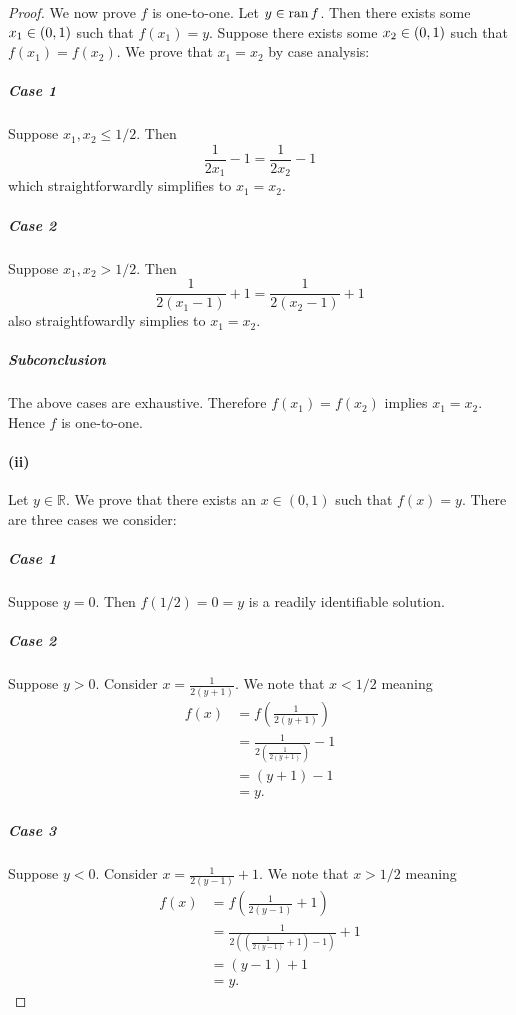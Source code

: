 \documentclass{report}
\begin{document}
\begin{proof}
      We now prove $f$ is one-to-one.
      Let $y \in \mathop{\text{ran}}{f}$.
      Then there exists some $x_1 \in \left(0, 1\right)$ such that $f(x_1) = y$.
      Suppose there exists some $x_2 \in \left(0, 1\right)$ such that $f(x_1) = f(x_2)$.
      We prove that $x_1 = x_2$ by case analysis:

      \subparagraph{Case 1}%

        Suppose $x_1, x_2 \leq 1 / 2$.
        Then $$\frac{1}{2x_1} - 1 = \frac{1}{2x_2} - 1$$ which straightforwardly
          simplifies to $x_1 = x_2$.

      \subparagraph{Case 2}%

        Suppose $x_1, x_2 > 1 / 2$.
        Then $$\frac{1}{2(x_1 - 1)} + 1 = \frac{1}{2(x_2 - 1)} + 1$$ also
          straightfowardly simplies to $x_1 = x_2$.

      \subparagraph{Subconclusion}%

        The above cases are exhaustive.
        Therefore $f(x_1) = f(x_2)$ implies $x_1 = x_2$.
        Hence $f$ is one-to-one.

    \paragraph{(ii)}%

      Let $y \in \mathbb{R}$.
      We prove that there exists an $x \in (0, 1)$ such that $f(x) = y$.
      There are three cases we consider:

      \subparagraph{Case 1}%

        Suppose $y = 0$.
        Then $f(1 / 2) = 0 = y$ is a readily identifiable solution.

      \subparagraph{Case 2}%

        Suppose $y > 0$.
        Consider $x = \frac{1}{2(y + 1)}$.
        We note that $x < 1 / 2$ meaning
          \begin{align*}
            f(x)
              & = f\left(\frac{1}{2(y + 1)}\right) \\
              & = \frac{1}{2(\frac{1}{2(y + 1)})} - 1 \\
              & = (y + 1) - 1 \\
              & = y.
          \end{align*}

      \subparagraph{Case 3}%

        Suppose $y < 0$.
        Consider $x = \frac{1}{2(y - 1)} + 1$.
        We note that $x > 1 / 2$ meaning
          \begin{align*}
            f(x)
              & = f\left(\frac{1}{2(y - 1)} + 1\right) \\
              & = \frac{1}{2((\frac{1}{2(y - 1)} + 1) - 1)} + 1 \\
              & = (y - 1) + 1 \\
              & = y.
          \end{align*}


\end{proof}
\end{document}
